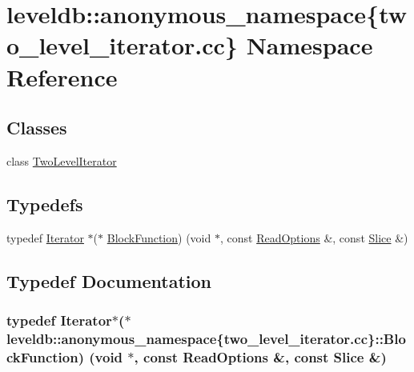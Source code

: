 \hypertarget{namespaceleveldb_1_1anonymous__namespace_02two__level__iterator_8cc_03}{}\section{leveldb\+:\+:anonymous\+\_\+namespace\{two\+\_\+level\+\_\+iterator.\+cc\} Namespace Reference}
\label{namespaceleveldb_1_1anonymous__namespace_02two__level__iterator_8cc_03}
\subsection*{Classes}
\begin{DoxyCompactItemize}
\item 
class \hyperlink{classleveldb_1_1anonymous__namespace_02two__level__iterator_8cc_03_1_1_two_level_iterator}{Two\+Level\+Iterator}
\end{DoxyCompactItemize}
\subsection*{Typedefs}
\begin{DoxyCompactItemize}
\item 
typedef \hyperlink{classleveldb_1_1_iterator}{Iterator} $\ast$($\ast$ \hyperlink{namespaceleveldb_1_1anonymous__namespace_02two__level__iterator_8cc_03_a5c9432df43722461670c1721d5b43f33}{Block\+Function}) (void $\ast$, const \hyperlink{structleveldb_1_1_read_options}{Read\+Options} \&, const \hyperlink{classleveldb_1_1_slice}{Slice} \&)
\end{DoxyCompactItemize}


\subsection{Typedef Documentation}
\hypertarget{namespaceleveldb_1_1anonymous__namespace_02two__level__iterator_8cc_03_a5c9432df43722461670c1721d5b43f33}{}
\subsubsection[{Block\+Function}]{\setlength{\rightskip}{0pt plus 5cm}typedef {\bf Iterator}$\ast$($\ast$ leveldb\+::anonymous\+\_\+namespace\{two\+\_\+level\+\_\+iterator.\+cc\}\+::Block\+Function) (void $\ast$, const {\bf Read\+Options} \&, const {\bf Slice} \&)}\label{namespaceleveldb_1_1anonymous__namespace_02two__level__iterator_8cc_03_a5c9432df43722461670c1721d5b43f33}
